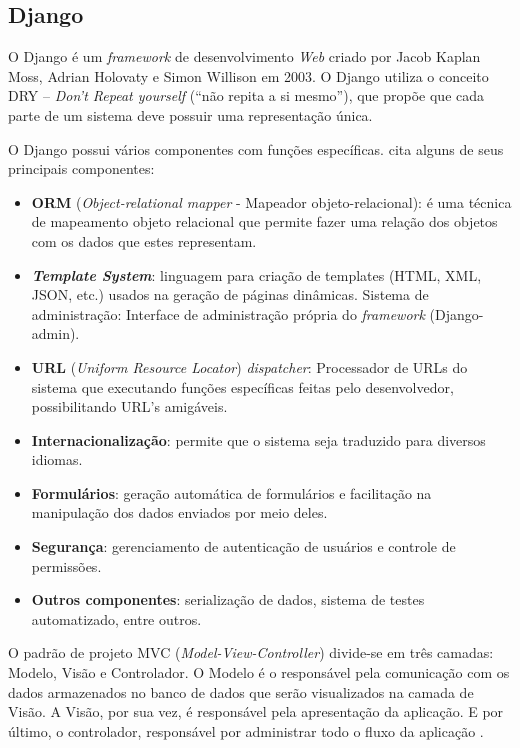 \documentclass[
	12pt,				%
    oneside,			%
	a4paper,			%
	english,			%
	french,				%
	spanish,			%
	brazil,				%
	]{abntex2}
\begin{document}
\subsection{Django}

O Django é um \textit{framework} de desenvolvimento \textit{Web} criado por Jacob Kaplan Moss,
Adrian Holovaty e Simon Willison em 2003. O Django utiliza o conceito DRY –
\textit{Don’t Repeat yourself} (“não repita a si mesmo”), que propõe que cada parte de um
sistema deve possuir uma representação única.

O Django possui vários componentes com funções específicas. 
cita alguns de seus principais componentes:

 \begin{itemize}

	\item \textbf{ORM} (\textit{Object-relational mapper} - Mapeador objeto-relacional): é
uma técnica de mapeamento objeto relacional que permite fazer uma
relação dos objetos com os dados que estes representam.
	\item \textbf{\textit{Template System}}: linguagem para criação de templates (HTML, XML,
JSON, etc.) usados na geração de páginas dinâmicas.
Sistema de administração: Interface de administração própria do
\textit{framework} (Django-admin).
	\item \textbf{URL} (\textit{Uniform Resource Locator}) \textit{dispatcher}: Processador de URLs
do sistema que executando funções específicas feitas pelo
desenvolvedor, possibilitando URL’s amigáveis.
	\item \textbf{Internacionalização}: permite que o sistema seja traduzido para
diversos idiomas.
	\item \textbf{Formulários}: geração automática de formulários e facilitação na
manipulação dos dados enviados por meio deles.
	\item \textbf{Segurança}: gerenciamento de autenticação de usuários e controle de
permissões.
	\item \textbf{Outros componentes}: serialização de dados, sistema de testes
automatizado, entre outros.

\end{itemize}

O padrão de projeto MVC (\textit{Model-View-Controller}) divide-se em três camadas: Modelo, Visão e
Controlador. O Modelo é o responsável pela comunicação com os dados
armazenados no banco de dados que serão visualizados na camada de Visão. A
Visão, por sua vez, é responsável pela apresentação da aplicação. E por último, o
controlador, responsável por administrar todo o fluxo da aplicação \cite{lemos}.
\end{document}
